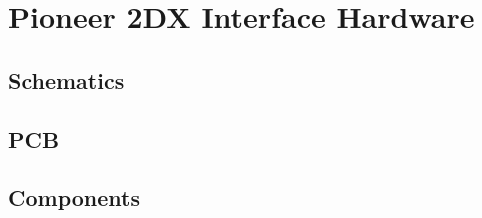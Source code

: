 \documentclass[../../monografia.tex]{subfiles}
\begin{document}
\chapter{Pioneer 2DX Interface Hardware}
\label{ap:Pioneer 2DX Interface Hardware}

\section{Schematics}









\section{PCB}


\section{Components}


\end{document}
